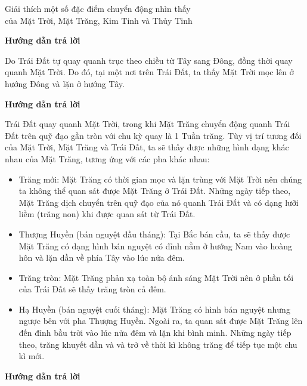 \begin{dang}{Giải thích một số đặc điểm chuyển động nhìn thấy\\ của Mặt Trời, Mặt Trăng, Kim Tinh và Thủy Tinh}
	{	\begin{center}
			\textbf{Hướng dẫn trả lời}
		\end{center}
		
		Do Trái Đất tự quay quanh trục theo chiều từ Tây sang Đông, đồng thời quay quanh Mặt Trời. Do đó, tại một nơi trên Trái Đất, ta thấy Mặt Trời mọc lên ở hướng Đông và lặn ở hướng Tây.
		
	}
	{	\begin{center}
			\textbf{Hướng dẫn trả lời}
		\end{center}
		
		Trái Đất quay quanh Mặt Trời, trong khi Mặt Trăng chuyển động quanh Trái Đất trên quỹ đạo gần tròn với chu kỳ quay là 1 Tuần trăng. Tùy vị trí tương đối của Mặt Trời, Mặt Trăng và Trái Đất, ta sẽ thấy được những hình dạng khác nhau của Mặt Trăng, tương ứng với các pha khác nhau:
		\begin{itemize}
			\item Trăng mới: Mặt Trăng có thời gian mọc và lặn trùng với Mặt Trời nên chúng ta không thể quan sát được Mặt Trăng ở Trái Đất. Những ngày tiếp theo, Mặt Trăng dịch chuyển trên quỹ đạo của nó quanh Trái Đất và có dạng lưỡi liềm (trăng non) khi được quan sát từ Trái Đất.
			\item Thượng Huyền (bán nguyệt đầu tháng): Tại Bắc bán cầu, ta sẽ thấy được Mặt Trăng có dạng hình bán nguyệt có đỉnh nằm ở hướng Nam vào hoàng hôn và lặn dần về phía Tây vào lúc nửa đêm.
			\item Trăng tròn: Mặt Trăng phản xạ toàn bộ ánh sáng Mặt Trời nên ở phần tối của Trái Đất sẽ thấy trăng tròn cả đêm.
			\item Hạ Huyền (bán nguyệt cuối tháng): Mặt Trăng có hình bán nguyệt nhưng ngược bên với pha Thượng Huyền. Ngoài ra, ta quan sát được Mặt Trăng lên đến đỉnh bầu trời vào lúc nửa đêm và lặn khi bình minh. Những ngày tiếp theo, trăng khuyết dần và và trở về thời kì không trăng để tiếp tục một chu kì mới.
		\end{itemize}
		
	}
	{	\begin{center}
			\textbf{Hướng dẫn trả lời}
		\end{center}
		
}
\end{dang}
